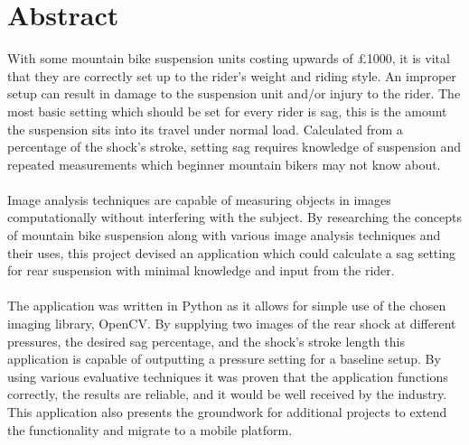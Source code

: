 \documentclass[a4paper, 12pt, hidelinks]{article}
\begin{document}
	\setcounter{secnumdepth}{4}
	\setcounter{tocdepth}{3}
	
	
	\setcounter{page}{1}
	\section*{Abstract}
		With some mountain bike suspension units costing upwards of £1000, it is vital that they are correctly set up to the rider's weight and riding style. An improper setup can result in damage to the suspension unit and/or injury to the rider. The most basic setting which should be set for every rider is sag, this is the amount the suspension sits into its travel under normal load. Calculated from a percentage of the shock's stroke, setting sag requires knowledge of suspension and repeated measurements which beginner mountain bikers may not know about.
		\\\\
		Image analysis techniques are capable of measuring objects in images computationally without interfering with the subject. By researching the concepts of mountain bike suspension along with various image analysis techniques and their uses, this project devised an application which could calculate a sag setting for rear suspension with minimal knowledge and input from the rider.
		\\\\
		The application was written in Python as it allows for simple use of the chosen imaging library, OpenCV. By supplying two images of the rear shock at different pressures, the desired sag percentage, and the shock's stroke length this application is capable of outputting a pressure setting for a baseline setup. By using various evaluative techniques it was proven that the application functions correctly, the results are reliable, and it would be well received by the industry. This application also presents the groundwork for additional projects to extend the functionality and migrate to a mobile platform.
	\clearpage
	\tableofcontents
	\clearpage
	\listoftables
	\clearpage
	\listoffigures
	\clearpage
	\listoflistings
	\clearpage
	
	\clearpage
	
	\clearpage
	
	\clearpage
	
	\clearpage	
	
	\clearpage
	
	\clearpage
		
	\clearpage
	\printacronyms
	\printglossary[type=main]
	
		\todos
\end{document}
